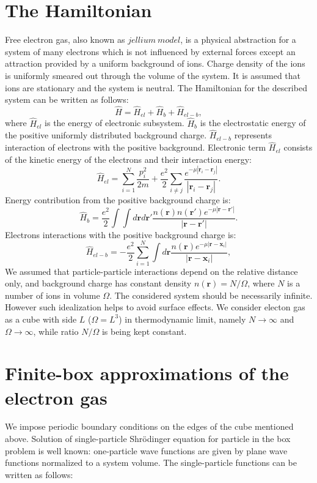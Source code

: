 \documentclass[twoside,english]{uiofysmaster}
\begin{document}
\section{The Hamiltonian}
Free electron gas, also known as $jellium\ model$, is a physical abstraction for a system of many electrons which is not influenced by external forces except an attraction provided by a uniform background of ions. Charge density of the ions is uniformly smeared out through the volume of the system. It is assumed that ions are stationary and the system is neutral.
The Hamiltonian for the described system can be written as follows:
\begin{equation}
	\hat{H}=\hat{H}_{el}+\hat{H}_{b}+\hat{H}_{el-b},
\end{equation}
where $\hat{H}_{el}$ is the energy of electronic subsystem. $\hat{H}_{b}$ is the electrostatic energy of the positive uniformly distributed background charge. $\hat{H}_{el-b}$ represents interaction of electrons with the positive background.
Electronic term $\hat{H}_{el}$ consists of the kinetic energy of the electrons and their interaction energy:
\begin{equation}
\hat{H}_{el}=\sum_{i=1}^N\frac{p_i^2}{2m}+\frac{e^2}{2}\sum_{i\ne j}\frac{e^{-\mu |\mathbf{r}_i-\mathbf{r}_j|}}{|\mathbf{r}_i-\mathbf{r}_j|}.
\end{equation}
Energy contribution from the positive background charge is:
\begin{equation}
\hat{H}_{b}=\frac{e^2}{2}\int\int d\mathbf{r}d\mathbf{r}'\frac{n(\mathbf{r})n(\mathbf{r}')e^{-\mu |\mathbf{r}-\mathbf{r}'|}}{|\mathbf{r}-\mathbf{r}'|}.
\end{equation}
Electrons interactions with the positive background charge is:
\begin{equation}
\hat{H}_{el-b}=-\frac{e^2}{2}\sum_{i=1}^N\int d\mathbf{r}\frac{n(\mathbf{r})e^{-\mu |\mathbf{r}-\mathbf{x}_i|}}{|\mathbf{r}-\mathbf{x}_i|},
\end{equation}
We assumed that particle-particle interactions depend on the relative distance only, and background charge has constant density $n(\mathbf{r}) = N/\Omega$, where $N$ is a number of ions in volume $\Omega$.
The considered system should be necessarily infinite. However such idealization helps to avoid surface effects.  
We consider electon gas as a cube with side $L$ ($\Omega = L^3$) in thermodynamic limit, namely $N \rightarrow \infty$ and $\Omega \rightarrow \infty$, while ratio $N/\Omega$ is being kept constant.


\section{Finite-box approximations of the electron gas}
We impose periodic boundary conditions on the edges of the cube mentioned above. Solution of single-particle Shr\"{o}dinger equation for particle in the box problem is well known: one-particle wave functions are given by plane wave functions normalized to a system volume. The single-particle functions can be written as follows:
\end{document}
